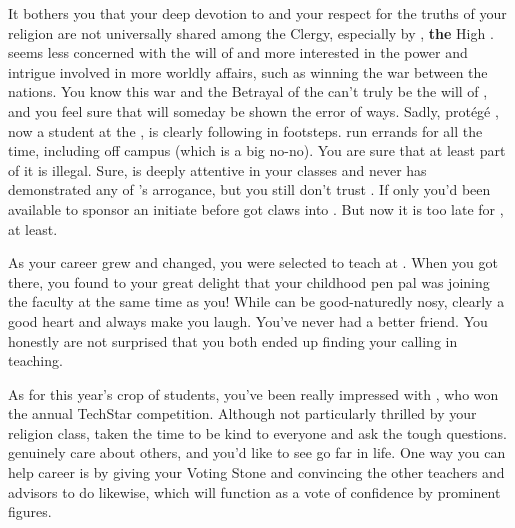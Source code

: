 \documentclass[char]{GL2020}
\begin{document}
It bothers you that your deep devotion to \cTechGod{} and your respect for the truths of your religion are not universally shared among the Clergy, especially by \cAntiChup{\full}, \textbf{the} High \cAntiChup{\Cleric}. \cAntiChup{} seems less concerned with the will of \cTechGod{} and more interested in the power and intrigue involved in more worldly affairs, such as winning the war between the nations. You know this war and the Betrayal of the \pShippies{} can't truly be the will of \cTechGod{}, and you feel sure that \cAntiChup{} will someday be shown the error of \cAntiChup{\their} ways. Sadly, \cAntiChup{\their} protégé \cScholarship{\full}, now a student at the \pSchool{}, is clearly following in \cAntiChup{\their} footsteps. \cScholarship{\They} run\cScholarship{\verbs} errands for \cAntiChup{} all the time, including off campus (which is a big no-no). You are sure that at least part of it is illegal. Sure, \cScholarship{} is deeply attentive in your classes and never has demonstrated any of \cAntiChup{}’s arrogance, but you still don’t trust \cScholarship{\them}. If only you'd been available to sponsor an initiate before \cAntiChup{} got \cAntiChup{\their} claws into \cScholarship{}. But now it is too late for \cScholarship{}, at least.

As your career grew and changed, you were selected to teach at \pSchool{}. When you got there, you found to your great delight that your childhood pen pal \cMusic{} was joining the faculty at the same time as you! While \cMusic{} can be good-naturedly nosy, \cMusic{\they} clearly \cMusic{\have} a good heart and always make\cMusic{\verbs} you laugh. You've never had a better friend. You honestly are not surprised that you both ended up finding your calling in teaching.

As for this year's crop of students, you've been really impressed with \cTechStar{\full}, who won the annual TechStar competition. Although \cTechStar{\they} \cTechStar{\are} not particularly thrilled by your religion class, \cTechStar{\they} \cTechStar{\have} taken the time to be kind to everyone and ask\cTechStar{\verbs} the tough questions. \cTechStar{\They} genuinely care\cTechStar{\verbs} about others, and you'd like to see \cTechStar{\them} go far in life. One way you can help \cTechStar{\their} career is by giving \cTechStar{\them} your Voting Stone and convincing the other teachers and advisors to do likewise, which will function as a vote of confidence by prominent figures. 
\end{document}
